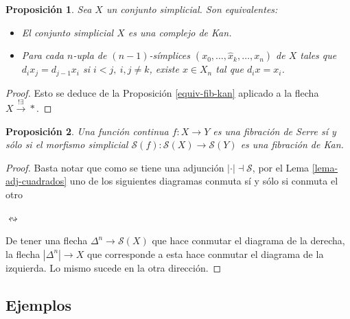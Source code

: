 \documentclass[11pt]{report}
\theoremstyle{colored}
\newtheorem{proposition}{Proposición}[section]
\renewcommand{\ss}[1]{\Delta^{#1}}
\newcommand{\horn}[2]{\Lambda^{#1}_{#2}}
\begin{document}
\begin{proposition} Sea $X$ un conjunto simplicial. Son equivalentes:
\begin{itemize}
\item[(i)] El conjunto simplicial $X$ es una complejo de Kan.
\item[(ii)] Para cada $n$-upla de $(n-1)$-símplices $(x_0,\dots,\widehat{x}_k,\dots, x_n)$ de $X$ tales que $d_ix_j = d_{j-1}x_i$ si $i < j, \ i,j \neq k$, existe $x \in X_n$ tal que $d_ix = x_i$.
\end{itemize}
\end{proposition}
\begin{proof} Esto se deduce de la Proposición \ref{equiv-fib-kan} aplicado a la flecha $X \xrightarrow{! \exists} \ast$.
\end{proof}

\begin{proposition} Una función continua $f : X \to Y$ es una fibración de Serre sí y sólo si el morfismo simplicial $\mathcal{S}(f) : \mathcal{S}(X) \to \mathcal{S}(Y)$ es una fibración de Kan.
\end{proposition}
\begin{proof} Basta notar que como se tiene una adjunción $| \cdot | \dashv \mathcal{S}$, por el Lema \ref{lema-adj-cuadrados} uno de los siguientes diagramas conmuta sí y sólo si conmuta el otro
\begin{center}
\quad$\leftrightsquigarrow$\quad
{}
\end{center}

De tener una flecha $\ss{n} \to \mathcal{S}(X)$ que hace conmutar el diagrama de la derecha, la flecha $|\ss{n}| \to X$ que corresponde a esta hace conmutar el diagrama de la izquierda. Lo mismo sucede en la otra dirección.
\end{proof}
\subsection{Ejemplos}
\end{document}
